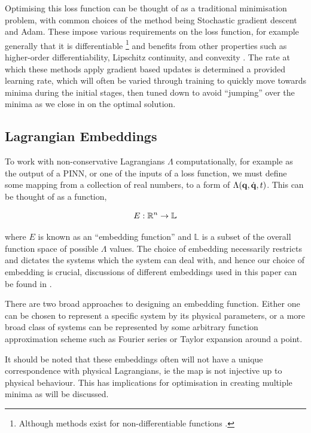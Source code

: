 Optimising this loss function can be thought of as a traditional minimisation problem, with common choices of the method being Stochastic gradient descent and Adam\cite{kingmaAdamMethodStochastic2017}. These impose various requirements on the loss function, for example generally that it is differentiable \footnote{Although methods exist for non-differentiable functions \cite{daubechiesIterativeThresholdingAlgorithm2003}.} and benefits from other properties such as higher-order differentiability, Lipschitz continuity, and convexity \cite{sraOptimizationMachineLearning2012}. The rate at which these methods apply gradient based updates is determined a provided learning rate, which will often be varied through training to quickly move towards minima during the initial stages, then tuned down to avoid \enquote{jumping} over the minima as we close in on the optimal solution.

\subsection{Lagrangian Embeddings}

To work with non-conservative Lagrangians $\Lambda$ computationally, for example as the output of a PINN, or one of the inputs of a loss function, we must define some mapping from a collection of real numbers, to a form of $\Lambda(\vb{q}, \dot{\vb{q}}, t)$. This can be thought of as a function,

\begin{equation}
  E: \mathbb{R}^n \to \mathbb{L}
\end{equation}

where $E$ is known as an \enquote{embedding function} and $\mathbb{L}$ is a subset of the overall function space of possible $\Lambda$ values. 
The choice of embedding necessarily restricts and dictates the systems which the system can deal with, and hence our choice of embedding is crucial, discussions of different embeddings used in this paper can be found in .

There are two broad approaches to designing an embedding function. Either one can be chosen to represent a specific system by its physical parameters, or a more broad class of systems can be represented by some arbitrary function approximation scheme such as Fourier series or Taylor expansion around a point.

It should be noted that these embeddings often will not have a unique correspondence with physical Lagrangians, ie the map is not injective up to physical behaviour. This has implications for optimisation in creating multiple minima as will be discussed.


